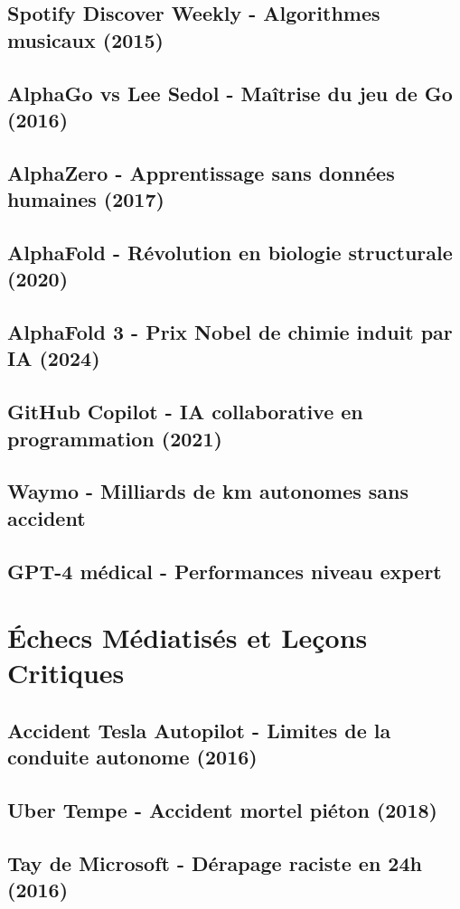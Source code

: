 \documentclass[12pt,a4paper]{book}
\begin{document}
\section{Spotify Discover Weekly - Algorithmes musicaux (2015)}
\section{AlphaGo vs Lee Sedol - Maîtrise du jeu de Go (2016)}
\section{AlphaZero - Apprentissage sans données humaines (2017)}
\section{AlphaFold - Révolution en biologie structurale (2020)}
\section{AlphaFold 3 - Prix Nobel de chimie induit par IA (2024)}
\section{GitHub Copilot - IA collaborative en programmation (2021)}
\section{Waymo - Milliards de km autonomes sans accident}
\section{GPT-4 médical - Performances niveau expert}

\chapter{Échecs Médiatisés et Leçons Critiques}
\section{Accident Tesla Autopilot - Limites de la conduite autonome (2016)}
\section{Uber Tempe - Accident mortel piéton (2018)}
\section{Tay de Microsoft - Dérapage raciste en 24h (2016)}
\end{document}
